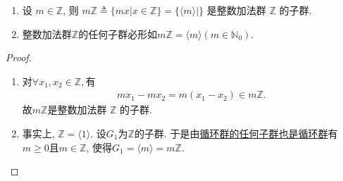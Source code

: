 \documentclass[../../main.tex]{subfiles}%
\begin{document}
\begin{corollary}\label{corollary:抽象代数--定理1.8.1推论}
\begin{enumerate}[(1)]
\item\label{corollary:抽象代数--定理1.8.1推论-1} 设 \( m \in \mathbb{Z} \), 则 \( m\mathbb{Z} \triangleq  \{mx|x \in \mathbb{Z}\}=\{\langle m \rangle\mid \} \) 是整数加法群 \( \mathbb{Z} \) 的子群. 

\item\label{corollary:抽象代数--定理1.8.1推论-2} 整数加法群$\mathbb{Z}$的任何子群必形如$m\mathbb{Z}=\langle m \rangle(m\in \mathbb{N}_0)$.
\end{enumerate}
\end{corollary}
\begin{proof}
\begin{enumerate}[(1)]
\item 对$\forall x_1,x_2\in \mathbb{Z},$有
\begin{align*}
mx_1-mx_2=m(x_1-x_2)\in m\mathbb{Z}.
\end{align*}
故$m\mathbb{Z}$是整数加法群 \( \mathbb{Z} \) 的子群. 

\item 事实上, $\mathbb{Z}=\langle 1\rangle$. 设$G_1$为$\mathbb{Z}$的子群. 于是由\hyperref[theorem:循环群的任何子群也是循环群]{循环群的任何子群也是循环群}有$m\geqslant 0\text{且}m\in \mathbb{Z}$, 使得$G_1=\langle m\rangle=m\mathbb{Z}$.
\end{enumerate}
\end{proof}
\end{document}
